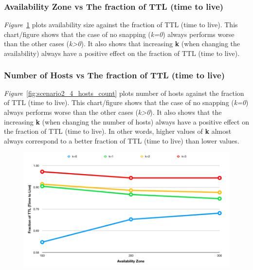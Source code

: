 {\subsubsection{Availability Zone vs The fraction of TTL (time to live)}
\emph{Figure}~\ref{fig:scenario2_3_availability_zone} plots availability size against the fraction of TTL (time to live). This chart/figure shows that the case of no snapping (\textit{k=0}) always performs worse than the other cases (\textit{k>0}). It also shows that increasing \textbf{k} (when changing the availability) always have a positive effect on the fraction of TTL (time to live).

\subsubsection{Number of Hosts vs The fraction of TTL (time to live)}
\emph{Figure}~\ref{fig:scenario2_4_hosts_count} plots number of hosts against the fraction of TTL (time to live). This chart/figure shows that the case of no snapping (\textit{k=0}) always performs worse than the other cases (\textit{k>0}). It also shows that the increasing \textbf{k} (when changing the number of hosts) always have a positive effect on the fraction of TTL (time to live). In other words, higher values of \textbf{k} almost always correspond to a better fraction of TTL (time to live) than lower values.
\vspace{1mm}
\begin{figure}[H]
  \centering
  \includegraphics[scale=0.39]{./figures/scenario2_3_availability_zone}
  \label{fig:scenario2_3_availability_zone}
\end{figure}
\vspace{2mm}
\begin{figure}[H]

\end{figure}}
